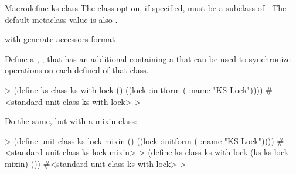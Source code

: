 \documentclass[10pt,twoside,english,pdftex]{article}
\begin{document}
\begin{functiondoc}{Macro}{define-ks-class}
%
The   class option, if specified,
must be a subclass of .  The
default metaclass value is also
.

\classoptioninheritance

\begin{alsos}{with-generate-accessors-format}
\also[define-ks]
\end{alsos}

\fnexamples Define a , , that has an
additional  containing a  that can be used to
synchronize operations on each defined  of that class.
%
\W\supp
\begin{example}
  > (define-ks-class ks-with-lock ()
      ((lock :initform ( :name "KS Lock"))))
  #<standard-unit-class ks-with-lock>
  >
\end{example}
%
Do the same, but with a mixin class:
%
\W\supp\notpretop
\begin{example}
  > (define-unit-class ks-lock-mixin ()
      ((lock :initform ( :name "KS Lock"))))
  #<standard-unit-class ks-lock-mixin>
  > (define-ks-class ks-with-lock (ks ks-lock-mixin)
      ())
  #<standard-unit-class ks-with-lock>
  >
\end{example}

\end{functiondoc}

\end{document}
